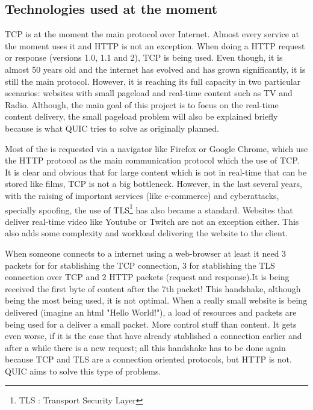 \subsection{Technologies used at the moment}
{
    TCP is at the moment the main protocol over Internet. Almost every service at the moment uses it and HTTP is not an exception. When doing a HTTP request or response (versions 1.0,
    1.1 and 2), TCP is being used. Even though, it is almost 50 years old and the internet has evolved and has grown significantly, it is still the main protocol. However, it is reaching
    its full capacity in two particular scenarios: websites with small pageload and real-time content such as TV and Radio. Although, the main goal of this project is to focus on the 
    real-time content delivery, the small pageload problem will also be explained briefly because is what QUIC tries to solve as originally planned.    
    
    Most of the is requested via a navigator like Firefox or Google Chrome, which use the HTTP protocol as the main communication protocol which the use of TCP. It is clear and obvious
    that for large content which is not in real-time that can be stored like films, TCP is not a big bottleneck. However, in the last several years, with the
    raising of important services (like e-commerce) and cyberattacks, specially spoofing, the use of TLS\footnote{TLS : Transport Security Layer} has also became a standard. Websites that
    deliver real-time video like Youtube or Twitch are not an exception either. This also adds some complexity and workload delivering the website to the client.

    When someone connects to a internet using a web-browser at least it need 3 packets for for stablishing the TCP connection, 3 for stablishing the TLS connection over 
    TCP and 2 HTTP packets (request and response).It is being received the first byte of content after the 7th packet! This handshake, although being the most being used,
    it is not optimal. When a really small website is being delivered (imagine an html "Hello World!"), a load of resources and packets are being used for a deliver a 
    small packet. More control stuff than content. It gets even worse, if it is the case that have already stablished a connection earlier and after a while there
    is a new request; all this handshake has to be done again because TCP and TLS are a connection oriented protocols, but HTTP is not. QUIC aims to solve this type of problems.
}
